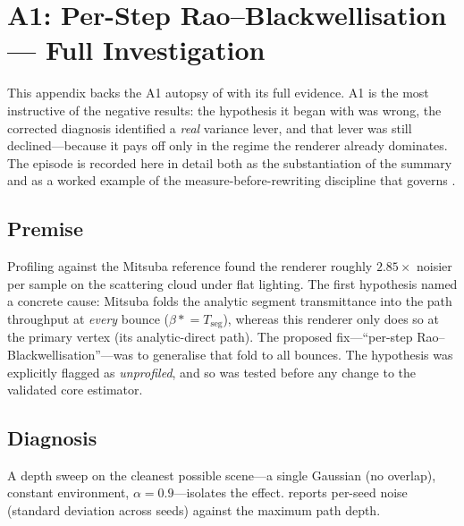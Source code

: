 \chapter{A1: Per-Step Rao--Blackwellisation --- Full Investigation}
\label{app:a1}

This appendix backs the A1 autopsy of  with its full evidence. A1 is the most
instructive of the negative results: the hypothesis it began with was wrong, the corrected diagnosis
identified a \emph{real} variance lever, and that lever was still declined---because it pays off only
in the regime the renderer already dominates. The episode is recorded here in detail both as the
substantiation of the summary and as a worked example of the measure-before-rewriting discipline that
governs .

\section{Premise}
\label{sec:a1-premise}

Profiling against the Mitsuba reference found the renderer roughly $2.85\times$ noisier per sample on
the scattering cloud under flat lighting. The first hypothesis named a concrete cause: Mitsuba folds
the analytic segment transmittance into the path throughput at \emph{every} bounce
($\beta \mathrel{*}= T_{\text{seg}}$), whereas this renderer only does so at the primary vertex (its
analytic-direct path). The proposed fix---``per-step Rao--Blackwellisation''---was to generalise that
fold to all bounces. The hypothesis was explicitly flagged as \emph{unprofiled}, and so was tested
before any change to the validated core estimator.

\section{Diagnosis}
\label{sec:a1-diagnosis}

A depth sweep on the cleanest possible scene---a single Gaussian (no overlap), constant environment,
$\alpha = 0.9$---isolates the effect.  reports per-seed noise (standard deviation
across seeds) against the maximum path depth.

